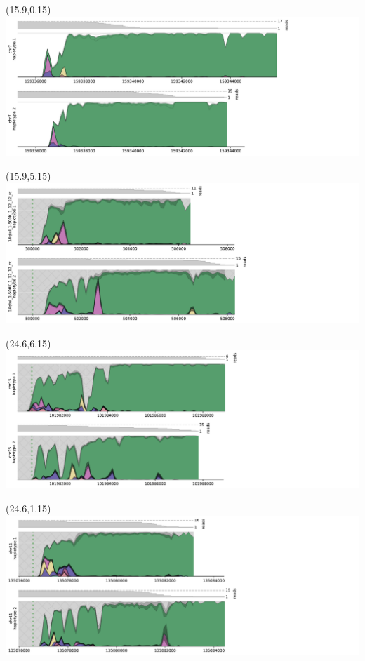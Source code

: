 \documentclass{article}
\begin{document}
\begin{textblock}{11}(15.9,0.15)  \includegraphics[width=11in]{main-figure-assets/densityplots/chr7-haps.pdf}                     \end{textblock}
\begin{textblock}{11}(15.9,5.15)  \includegraphics[width=11in]{main-figure-assets/densityplots/14qtel_1-500K_1_12_12_rc-haps.pdf} \end{textblock}
\begin{textblock}{11}(24.6,6.15)  \includegraphics[width=11in]{main-figure-assets/densityplots/chr15-haps.pdf}                    \end{textblock}
\begin{textblock}{11}(24.6,1.15)  \includegraphics[width=11in]{main-figure-assets/densityplots/chr11-haps.pdf}                    \end{textblock}
\end{document}
